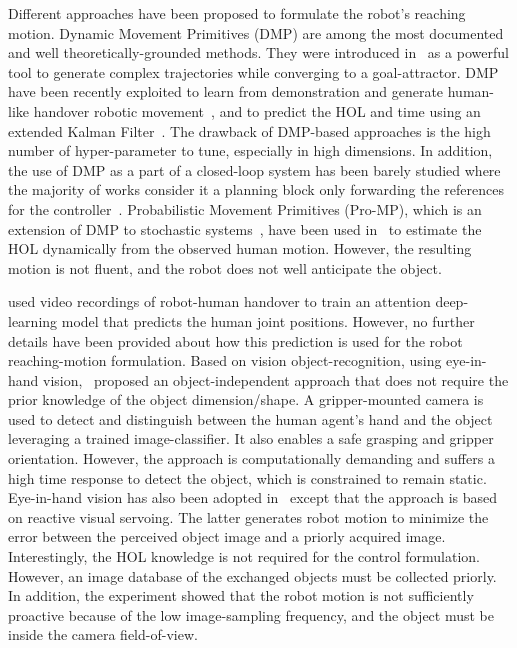 Different approaches have been proposed to formulate the robot's reaching motion. Dynamic Movement Primitives (DMP) are among the most documented and well theoretically-grounded methods. They were introduced in~\cite{ijspeert2002icra,schaal2005springer} as a powerful tool to generate complex trajectories while converging to a goal-attractor. DMP have been recently exploited to learn from demonstration and generate human-like handover robotic movement~\cite{prada2014iros}, and to predict the HOL and time using an extended Kalman Filter~\cite{widmann2018ecc}. The drawback of DMP-based approaches is the high number of hyper-parameter to tune, especially in high dimensions. In addition, the use of DMP as a part of a closed-loop system has been barely studied where the majority of works consider it a planning block only forwarding the references for the controller~\cite{saveriano2021arxiv}.
Probabilistic Movement Primitives (Pro-MP), which is an extension of DMP to stochastic systems~\cite{paraschos2013anips}, have been used in~\cite{nemlekar2019icra} to estimate the HOL dynamically from the observed human motion. However, the resulting motion is not fluent, and the robot does not well anticipate the object. 

\cite{laplaza2021roman} used video recordings of robot-human handover to train an attention deep-learning model that predicts the human joint positions. However, no further details have been provided about how this prediction is used for the robot reaching-motion formulation. Based on vision object-recognition, using eye-in-hand vision,~\cite{rosenberger2021ral} proposed an object-independent approach that does not require the prior knowledge of the object dimension/shape. A gripper-mounted camera is used to detect and distinguish between the human agent's hand and the object leveraging a trained image-classifier. It also enables a safe grasping and gripper orientation. However, the approach is computationally demanding and suffers a high time response to detect the object, which is constrained to remain static. Eye-in-hand vision has also been adopted in~\cite{costanzo2021frontiersRob-AI} except that the approach is based on reactive visual servoing. The latter generates robot motion to minimize the error between the perceived object image and a priorly acquired image.
Interestingly, the HOL knowledge is not required for the control formulation. However, an image database of the exchanged objects must be collected priorly. In addition, the experiment showed that the robot motion is not sufficiently proactive because of the low image-sampling frequency, and the object must be inside the camera field-of-view. 

